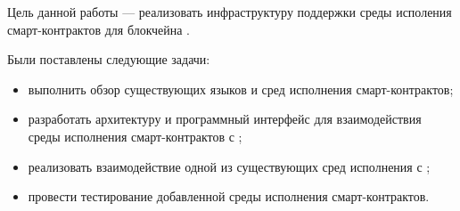 Цель данной работы --- реализовать инфраструктуру поддержки среды исполения смарт-контрактов для блокчейна .

Были поставлены следующие задачи:
\begin{itemize}
    \item выполнить обзор существующих языков и сред исполнения смарт-кон\-трак\-тов;
    \item разработать архитектуру и программный интерфейс для взаимодействия среды исполнения смарт-контрактов с ;
    \item реализовать взаимодействие одной из существующих сред исполнения с ;
    \item провести тестирование добавленной среды исполнения смарт-кон\-трак\-тов.
\end{itemize}